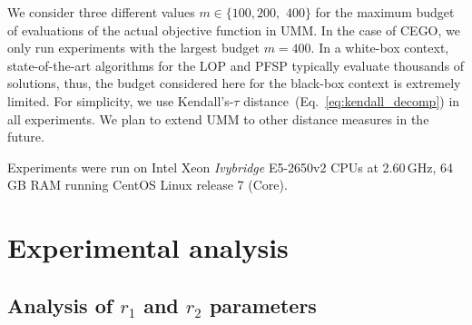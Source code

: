 \documentclass[sigconf,dvipsnames]{acmart}
\newcommand{\FEmax}{\ensuremath{m}}
\begin{document}

%
We consider three different values $\FEmax \in\{100, 200,$ $400\}$ for the maximum
budget of evaluations of the actual objective function in UMM. In the case of
CEGO, we only run experiments with the largest budget $m=400$.  In a white-box
context, state-of-the-art algorithms for the LOP and PFSP typically evaluate
thousands of solutions, thus, the budget considered here for the black-box
context is extremely limited.
%
For simplicity, we use Kendall's-$\tau$
distance~(Eq.~\ref{eq:kendall_decomp}) in all experiments.
We plan to extend UMM to other distance measures in the future.  

Experiments were run on Intel Xeon \emph{Ivybridge} E5-2650v2 CPUs at
2.60\,GHz, 64\,GB RAM running CentOS Linux release 7 (Core).

\section{Experimental analysis}\label{sec:analysis}

\subsection{Analysis of $r_1$ and $r_2$ parameters}
\end{document}
